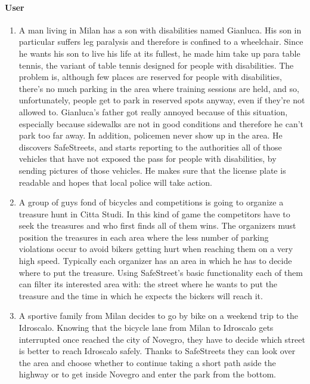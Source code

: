 		\paragraph{User}
		\begin{enumerate}
			\item \label{sce:notification} A man living in Milan has a son with disabilities named Gianluca. His son in particular suffers leg paralysis and therefore is confined to a wheelchair. Since he wants his son to live his life at its fullest, he made him take up para table tennis, the variant of table tennis designed for people with disabilities. The problem is, although few places are reserved for people with disabilities, there’s no much parking in the area where training sessions are held, and so, unfortunately, people get to park in reserved spots anyway, even if they’re not allowed to. Gianluca’s father got really annoyed because of this situation, especially because sidewalks are not in good conditions and therefore he can’t park too far away. In addition, policemen never show up in the area. He discovers SafeStreets, and starts reporting to the authorities all of those vehicles that have not exposed the pass for people with disabilities, by sending pictures of those vehicles. He makes sure that the license plate is readable and hopes that local police will take action.
			
			\item \label{sce:basicUser} A group of guys fond of bicycles and competitions is going to organize a treasure hunt in Citta Studi. In this kind of game the competitors have to seek the treasures and who first finds all of them wins. The organizers must position the treasures in each area where the less number of parking violations occur to avoid bikers getting hurt when reaching them on a very high speed. Typically each organizer has an area in which he has to decide where to put the treasure. Using SafeStreet’s basic functionality each of them can filter its interested area with: the street where he wants to put the treasure and the time in which he expects the bickers will reach it.
			
			\item \label{sce:advancedUser} A sportive family from Milan decides to go by bike on a weekend trip to the Idroscalo. Knowing that the bicycle lane from Milan to Idroscalo gets interrupted once reached the city of Novegro, they have to decide which street is better to reach Idroscalo safely. Thanks to SafeStreets they can look over the area and choose whether to continue taking a short path aside the highway or to get inside Novegro and enter the park from the bottom. 
		\end{enumerate}
	
